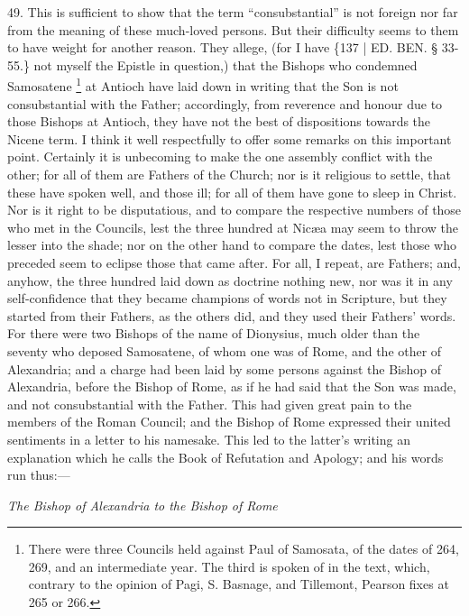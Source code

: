 49. This is sufficient to show
that the term ``consubstantial'' is not foreign nor far from the meaning
of these much-loved persons. But their difficulty seems to them to
have weight for another reason. They allege, (for I have \{137 | ED.
BEN.
§ 33-55.\} not myself the Epistle in question,) that the Bishops who
condemned Samosatene \footnote{There were three Councils held against Paul of Samosata, of the dates
of 264, 269, and an intermediate year. The third is spoken of in the
text, which, contrary to the opinion of Pagi, S. Basnage, and
Tillemont, Pearson fixes at 265 or 266.}
at Antioch have laid down in writing that the Son is not
consubstantial with the Father; accordingly, from reverence and honour
due to those Bishops at Antioch, they have not the best of
dispositions towards the Nicene term. I think it well respectfully to
offer some remarks on this important point. Certainly it is unbecoming
to make the one assembly conflict with the other; for all of them are
Fathers of the Church; nor is it religious to settle, that these have
spoken well, and those ill; for all of them have gone to sleep in
Christ. Nor is it right to be disputatious, and to compare the
respective numbers of those who met in the Councils, lest the three
hundred at Nicæa may seem to throw the lesser into the shade; nor on
the other hand to compare the dates, lest those who preceded seem to
eclipse those that came after. For all, I repeat, are Fathers; and,
anyhow, the three hundred laid down as doctrine nothing new, nor was
it in any self-confidence that they became champions of words not in
Scripture, but they started from their Fathers, as the others did, and
they used their Fathers' words. For there were two Bishops of the name
of Dionysius, much older than the seventy who deposed Samosatene, of
whom one was of Rome, and the other of Alexandria; and a charge had
been laid by some persons against the Bishop of Alexandria, before the
Bishop of Rome, as if he had said that the Son was made, and not
consubstantial with the Father. This had given great pain to the
members of the Roman Council; and the Bishop of Rome expressed their
united sentiments in a letter to his namesake. This led to the
latter's writing an explanation which he calls the Book of Refutation
and Apology; and his words run thus:—

\emph{The
Bishop of Alexandria to the Bishop of Rome}

